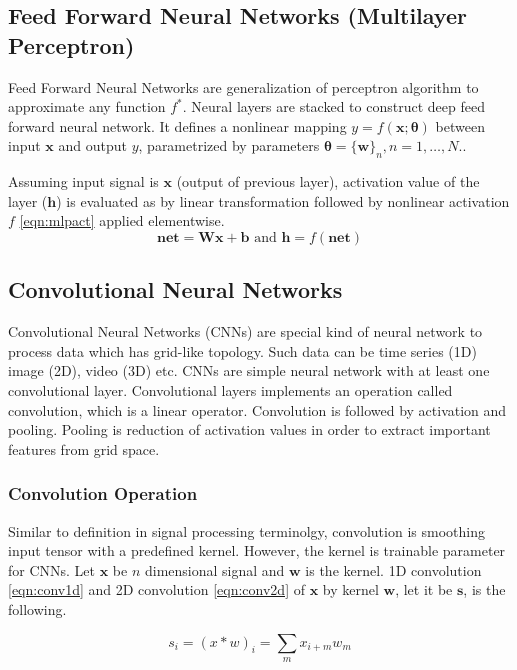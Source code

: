 \subsection{Feed Forward Neural Networks (Multilayer Perceptron)}
Feed Forward Neural Networks are generalization of perceptron algorithm to approximate any function $f^*$. Neural layers are stacked to construct deep feed forward neural network. It defines a nonlinear mapping $y=f(\boldsymbol{x};\boldsymbol{\theta})$ between input $\boldsymbol{x}$ and output $y$, parametrized by parameters $\boldsymbol{\theta} = \{\boldsymbol{w}\}_n,n=1,…,N.$.

Assuming input signal is $\boldsymbol{x}$ (output of previous layer), activation value of the layer ($\boldsymbol{h}$) is evaluated as by linear transformation followed by nonlinear activation $f$ \ref{eqn:mlpact} applied elementwise.
\begin{equation}
\label{eqn:mlpact}
\boldsymbol{net} = \boldsymbol{W} \boldsymbol{x} + \boldsymbol{b} \text{ and } \boldsymbol{h} = f(\boldsymbol{net})
\end{equation}

\subsection{Convolutional Neural Networks}
Convolutional Neural Networks (CNNs) are special kind of neural network to process data which has grid-like topology. Such data can be time series (1D) image (2D), video (3D) etc. CNNs are simple neural network with at least one convolutional layer. Convolutional layers implements an operation called convolution, which is a linear operator. Convolution is followed by activation and pooling. Pooling is reduction of activation values in order to extract important features from grid space.

\subsubsection{Convolution Operation}
Similar to definition in signal processing terminolgy, convolution is smoothing input tensor with a predefined kernel. However, the kernel is trainable parameter for CNNs. Let $\boldsymbol{x}$ be $n$ dimensional signal and $\boldsymbol{w}$ is the kernel. 1D convolution \ref{eqn:conv1d} and 2D convolution \ref{eqn:conv2d} of $\boldsymbol{x}$ by kernel $\boldsymbol{w}$, let it be $\boldsymbol{s}$, is the following.

\begin{equation}
\label{eqn:conv1d}
s_i = (x*w)_i = \sum_{m} x_{i+m} w_m
\end{equation}

